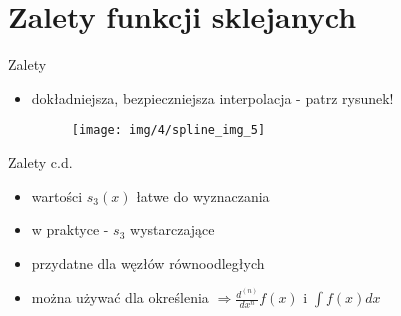 \section{Zalety funkcji sklejanych}
\begin{frame}{Zalety}
	\begin{itemize}
	\item dokładniejsza, bezpieczniejsza interpolacja - patrz rysunek!
    \begin{figure}[h]
			\texttt{[image: img/4/spline\_img\_5]}
		\end{figure}
	\end{itemize}
\end{frame}
\begin{frame}{Zalety c.d.}
	\begin{itemize}
		\item wartości $s_{3}(x)$ łatwe do wyznaczania
    	\item w praktyce - $s_{3}$ wystarczające
    	\item przydatne dla węzłów równoodległych
    	\item można używać dla określenia $\Rightarrow \frac{d^{(n)}}	
        	{dx^{n}}f(x)$
    		i $\int f(x)dx$ 
	\end{itemize}
	
\end{frame}







